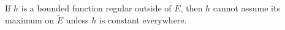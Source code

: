 If $h$ is a bounded function regular outside of $E$, then $h$ cannot assume its maximum on $\tilde{E}$ unless $h$ is constant everywhere.
